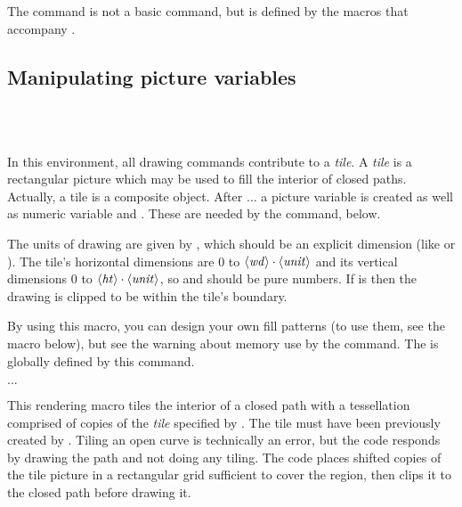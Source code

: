 \documentclass[letterpaper]{article}
\begin{document}
The  command is not a basic \MF{} command, but is defined
by the  macros that accompany \mfp{}.


\subsection{Manipulating \MF{} picture variables}

\begin{cd}
\\
  \ \\
%
%
\end{cd}

In this environment, all drawing commands contribute to a \emph{tile}. A
\emph{tile} is a rectangular picture which may be used to fill the
interior of closed paths. Actually, a tile is a composite object. After
 $\ldots$  a picture variable
 is created as well as numeric variable  and
. These are needed by the  command, below.

The units of drawing are given by , which should be an
explicit dimension (like \dim{1pt} or \dim{2in}). The tile's horizontal
dimensions are $0$ to $\langle\mbox{\rmfamily\itshape wd\/}\rangle\cdot\langle\mbox{\rmfamily\itshape unit\/}\rangle$ and its vertical
dimensions $0$ to $\langle\mbox{\rmfamily\itshape ht\/}\rangle\cdot\langle\mbox{\rmfamily\itshape unit\/}\rangle$, so  and
 should be pure numbers. If  is  then the
drawing is clipped to be within the tile's boundary.

By using this macro, you can design your own fill patterns (to use them,
see the  macro below), but see the warning about memory use by
the  command. The  is globally defined by this
command.

\begin{cd}
$\ldots$%
\end{cd}

This rendering macro tiles the interior of a closed path with a
tessellation comprised of copies of the \emph{tile} specified by
. The tile must have been previously created by
. Tiling an open curve is
technically an error, but the \MF{} code responds by drawing the path
and not doing any tiling. The \MF{} code places shifted copies of the
tile picture in a rectangular grid sufficient to cover the region, then
clips it to the closed path before drawing it.
\end{document}

